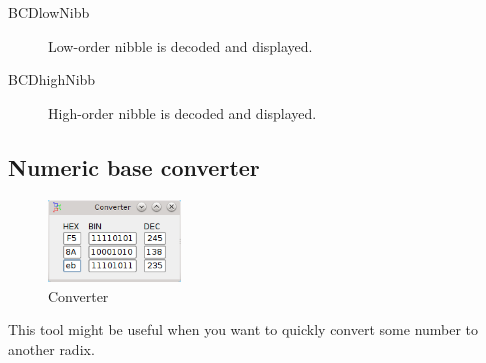         \begin{description}
            \item[BCDlowNibb] Low-order nibble is decoded and displayed.
            \item[BCDhighNibb] High-order nibble is decoded and displayed.
        \end{description}

    \subsection{Numeric base converter}
        \begin{figure}
            \centering
            \includegraphics[width=100pt]{img/converter.png}
            \caption{Converter}
        \end{figure}
        This tool might be useful when you want to quickly convert some number to another radix.
